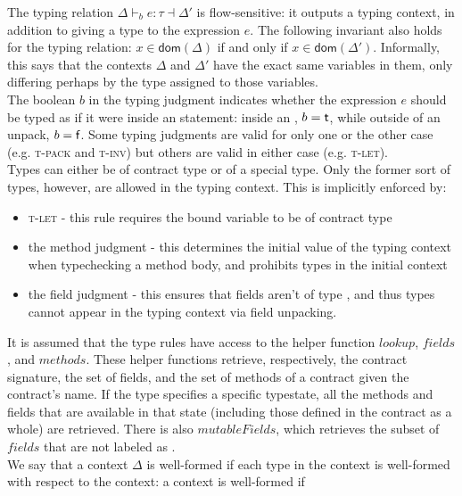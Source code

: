 \documentclass[runningheads,a4paper]{llncs}
\begin{document}
The typing relation $\Delta \vdash_{b} e : \tau \dashv \Delta'$ is flow-sensitive: it outputs a typing context, in addition to giving a type to the expression $e$. The following invariant also holds for the typing relation: $x \in \textsf{dom}(\Delta)$ if and only if $x \in \textsf{dom}(\Delta')$. Informally, this says that the contexts $\Delta$ and $\Delta'$ have the exact same variables in them, only differing perhaps by the type assigned to those variables.\\

The boolean $b$ in the typing judgment indicates whether the expression $e$ should be typed as if it were inside an \unpackS{} statement: inside an \unpackS{}, $b = \textsf{t}$, while outside of an unpack, $b = \textsf{f}$. Some typing judgments are valid for only one or the other case (e.g. \textsc{t-pack} and \textsc{t-inv}) but others are valid in either case (e.g. \textsc{t-let}).\\

Types can either be of contract type or of a special \packS{} type. Only the former sort of types, however, are allowed in the typing context. This is implicitly enforced by:

\begin{itemize}
\item \textsc{t-let} - this rule requires the bound variable to be of contract type
\item the method \okS{} judgment - this determines the initial value of the typing context when typechecking a method body, and prohibits \packS{} types in the initial context
\item the field \okS{} judgment - this ensures that fields aren't of type \packS{}, and thus \packS{} types cannot appear in the typing context via field unpacking.
\end{itemize}

It is assumed that the type rules have access to the helper function $lookup$, $fields$, and $methods$. These helper functions retrieve, respectively, the contract signature, the set of fields, and the set of methods of a contract given the contract's name. If the type specifies a specific typestate, all the methods and fields that are available in that state (including those defined in the contract as a whole) are retrieved. There is also $mutableFields$, which retrieves the subset of $fields$ that are not labeled as \constS{}.\\

We say that a context $\Delta$ is well-formed if each type in the context is well-formed with respect to the context: a context is well-formed if 
\end{document}
